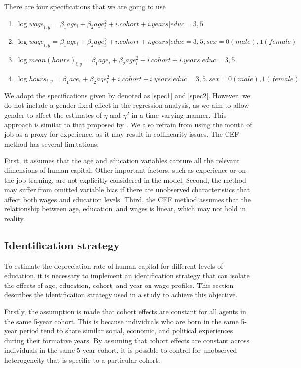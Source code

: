 \documentclass[12pt]{article}
\begin{document}
There are four specifications that we are going to use 
\begin{enumerate}
    \item   \label{spec1}    \(\log{wage}_{i,y}=   \beta_1 age_{i}+ \beta_2 age_{i}^2+i.cohort+i.years |educ={3,5}\)
    \item   \label{spec2}    \(\log{wage}_{i,y}=   \beta_1 age_{i}+ \beta_2 age_{i}^2+i.cohort+i.years |educ={3,5},sex=
    {0 (male), 1 (female)}\)
    \item  \label{spec3}    \(\log{mean(hours)}_{i,y}=  \beta_1 age_{i}+ \beta_2 age_{i}^2+i.cohort+i.years |educ={3,5}\)
    \item   \label{spec4}    \(\log{hours}_{i,y}= \beta_1 age_{i}+ \beta_2 age_{i}^2+i.cohort+i.years |educ={3,5},sex=
    {0 (male), 1 (female)}\)
\end{enumerate}
We adopt the specifications given by \citet{hendricks2013ben} denoted as \ref{spec1} and \ref{spec2}. However, we do not
include a gender fixed effect in the regression analysis, as we aim to allow gender to affect the estimates of $\eta$
and $\eta^2$ in a time-varying manner. This approach is similar to that proposed by \citet{joshi2021gender}. We also
refrain from using the month of job as a proxy for experience, as it may result in collinearity issues. The CEF method has several
limitations. 
\par
First, it assumes that the age and education variables capture all the relevant dimensions of human
capital. Other important factors, such as experience or on-the-job training, are not
explicitly considered in the model. Second, the method may suffer from omitted variable bias if there are unobserved
characteristics that affect both wages and education levels. Third, the CEF method assumes that the relationship between
age, education, and wages is linear, which may not hold in reality. 

\subsection{Identification strategy}
To estimate the depreciation rate of human capital for different levels of education, it is necessary to
implement an identification strategy that can isolate the effects of age, education, cohort, and year on wage profiles.
This section describes the identification strategy used in a study to achieve this objective.
\par
Firstly, the assumption is made that cohort effects are constant for all agents in the same 5-year cohort. This is
because individuals who are born in the same 5-year period tend to share similar social, economic, and political
experiences during their formative years. By assuming that cohort effects are constant across individuals in the same
5-year cohort, it is possible to control for unobserved heterogeneity that is specific to a particular cohort.
\end{document}
